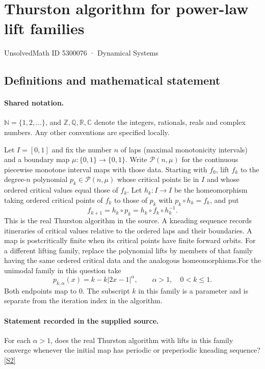 \documentclass[11pt]{article}
\newcommand{\sref}[2]{\hyperlink{source:#1:#2}{[S#2]}}
\begin{document}
\setcounter{section}{5300075}
\section{Thurston algorithm for power-law lift families}\label{5300076}
{\small\sffamily UnsolvedMath ID 5300076 · Dynamical Systems}
\subsection{Definitions and mathematical statement}

\paragraph{Shared notation.}$\mathbb N=\{1,2,\ldots\}$, and $\mathbb Z,\mathbb Q,\mathbb R,\mathbb C$ denote the integers, rationals, reals and complex numbers. Any other conventions are specified locally.


Let $I=[0,1]$ and fix the number $n$ of laps (maximal monotonicity intervals) and a boundary map $\mu:\{0,1\}\to\{0,1\}$. Write $\mathcal P(n,\mu)$ for the continuous piecewise monotone interval maps with those data. Starting with $f_0$, lift $f_k$ to the degree-$n$ polynomial $p_k\in\mathcal P(n,\mu)$ whose critical points lie in $I$ and whose ordered critical values equal those of $f_k$. Let $h_k:I\to I$ be the homeomorphism taking ordered critical points of $f_k$ to those of $p_k$ with $p_k\circ h_k=f_k$, and put
\[f_{k+1}=h_k\circ p_k=h_k\circ f_k\circ h_k^{-1}.\]
This is the real Thurston algorithm in the source. A kneading sequence records itineraries of critical values relative to the ordered laps and their boundaries. A map is postcritically finite when its critical points have finite forward orbits. For a different lifting family, replace the polynomial lifts by members of that family having the same ordered critical data and the analogous homeomorphisms.For the unimodal family in this question take
\[p_{k,\alpha}(x)=k-k|2x-1|^\alpha,\qquad \alpha>1,\quad 0<k\leq1.\]
Both endpoints map to $0$. The subscript $k$ in this family is a parameter and is separate from the iteration index in the algorithm.
\paragraph{Statement recorded in the supplied source.}
For each $\alpha>1$, does the real Thurston algorithm with lifts in this family converge whenever the initial map has periodic or preperiodic kneading sequence? \sref{5300076}{2}
\end{document}
